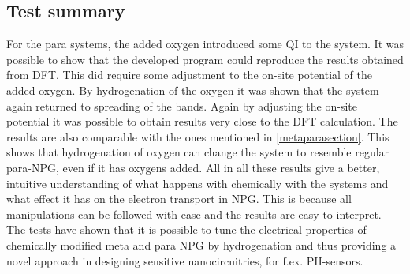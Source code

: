 \subsection{Test summary}
For the para systems, the added oxygen introduced some QI to the system. It was possible to show that the developed program could reproduce the results obtained from DFT. This did require some adjustment to the on-site potential of the added oxygen. By hydrogenation of the oxygen it was shown that the system again returned to spreading of the bands. Again by adjusting the on-site potential it was possible to obtain results very close to the DFT calculation. The results are also comparable with the ones mentioned in \cref{metaparasection}. This shows that hydrogenation of oxygen can change the system to resemble regular para-NPG, even if it has oxygens added. All in all these results give a better, intuitive understanding of what happens with chemically with the systems and what effect it has on the electron transport in NPG. This is because all manipulations can be followed with ease and the results are easy to interpret. The tests have shown that it is possible to tune the electrical properties of chemically modified meta and para NPG by hydrogenation and thus providing a novel approach in designing sensitive nanocircuitries, for f.ex. PH-sensors.
